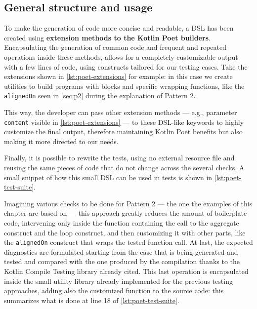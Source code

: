 \documentclass[12pt,a4paper,openright,twoside]{book}
\begin{document}
\subsection{General structure and usage}

To make the generation of code more concise and readable, a \ac{DSL} has been
created using \textbf{extension methods to the Kotlin Poet builders}.
Encapsulating the generation of common code and frequent and repeated operations
inside these methods, allows for a completely customizable output with a few
lines of code, using constructs tailored for our testing cases. 
%
Take the extensions shown in \cref{lst:poet-extensions} for example: in this
case we create utilities to build programs with blocks and specific wrapping
functions, like the \lstinline{alignedOn} seen in \cref{sec:p2} during the
explanation of Pattern 2. 
%

%
This way, the developer can pass other extension methods --- e.g., parameter
\lstinline{content} visible in \cref{lst:poet-extensions} --- to these
\ac{DSL}-like keywords to highly customize the final output, therefore 
maintaining Kotlin Poet benefits but also making it more directed to 
our needs. 

Finally, it is possible to rewrite the tests, using no external resource file
and reusing the same pieces of code that do not change across the several
checks. A small snippet of how this small \ac{DSL} can be used in tests is shown
in \cref{lst:poet-test-suite}.



Imagining various checks to be done for Pattern 2 --- the one the examples of
this chapter are based on --- this approach greatly reduces the amount of
boilerplate code, intervening only inside the function containing the call
to the aggregate construct and the loop construct, and then customizing it 
with other parts, like the \lstinline{alignedOn} construct that wraps the 
tested function call. 
%
At last, the expected diagnostics are formulated starting from the case that is
being generated and tested and compared with the one produced by the compilation
thanks to the Kotlin Compile Testing library already cited. 
%
This last operation is encapsulated inside the small utility library already
implemented for the previous testing approaches, adding also the customized
function to the source code: this summarizes what is done at line 18 of
\cref{lst:poet-test-suite}.
\end{document}
